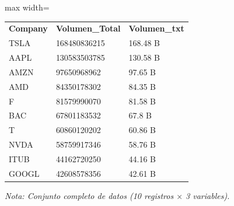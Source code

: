

\begin{table}[htbp]

\centering

\begin{adjustbox}{max width=\textwidth}

\begin{tabular}{lll}

\rowcolor{ThemeBackground}
\rule{0pt}{0.45cm}
\textcolor{ThemeGold}{\bfseries Company} & \textcolor{ThemeGold}{\bfseries Volumen\_Total} & \textcolor{ThemeGold}{\bfseries Volumen\_txt} \\

TSLA & 168480836215 & 168.48 B \\
AAPL & 130583503785 & 130.58 B \\
AMZN & 97650968962 & 97.65 B \\
AMD & 84350178302 & 84.35 B \\
F & 81579990070 & 81.58 B \\
BAC & 67801183532 & 67.8 B \\
T & 60860120202 & 60.86 B \\
NVDA & 58759917346 & 58.76 B \\
ITUB & 44162720250 & 44.16 B \\
GOOGL & 42608578356 & 42.61 B \\
\bottomrule
\end{tabular}

\end{adjustbox}

\vspace{0.15cm}
{\raggedright\sffamily\footnotesize\color{ThemeMuted}
\textit{Nota: Conjunto completo de datos (10 registros $\times$ 3 variables).}}

\end{table}
